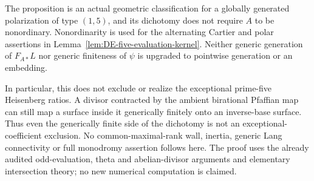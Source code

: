 \begin{remark}
\label{rem:DE-five-evaluation-fibre-scope}
The proposition is an actual geometric classification for a
globally generated polarization of type \((1,5)\), and its
dichotomy does not require \(A\) to be nonordinary. Nonordinarity
is used for the alternating Cartier and polar assertions in
Lemma~\ref{lem:DE-five-evaluation-kernel}. Neither generic
generation of \(F_{A*}L\) nor generic finiteness of \(\psi\)
is upgraded to pointwise generation or an embedding.

In particular, this does not exclude or realize the exceptional
prime-five Heisenberg ratios. A divisor contracted by the ambient
birational Pfaffian map can still map a surface inside it
generically finitely onto an inverse-base surface. Thus even
the generically finite side of the dichotomy is not an
exceptional-coefficient exclusion. No common-maximal-rank wall,
inertia, generic Lang connectivity or full monodromy assertion
follows here. The proof uses the already audited odd-evaluation,
theta and abelian-divisor arguments and elementary intersection
theory; no new numerical computation is claimed.
\end{remark}
